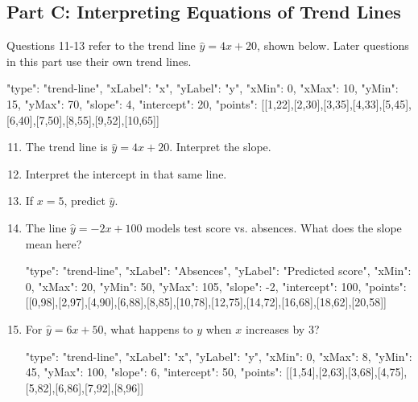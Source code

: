 \documentclass[14pt]{extarticle}
\begin{document}
\subsection*{Part C: Interpreting Equations of Trend Lines}
Questions 11-13 refer to the trend line \(\hat{y} = 4x + 20\), shown below. Later questions in this part use their own trend lines.

\begin{diagramdata}
{
  "type": "trend-line",
  "xLabel": "x",
  "yLabel": "y",
  "xMin": 0,
  "xMax": 10,
  "yMin": 15,
  "yMax": 70,
  "slope": 4,
  "intercept": 20,
  "points": [[1,22],[2,30],[3,35],[4,33],[5,45],[6,40],[7,50],[8,55],[9,52],[10,65]]
}
\end{diagramdata}

\begin{enumerate}
  \setcounter{enumi}{10}
  \item The trend line is \(\hat{y} = 4x + 20\). Interpret the slope.
  \item Interpret the intercept in that same line.
  \item If \(x = 5\), predict \(\hat{y}\).
  \item The line \(\hat{y} = -2x + 100\) models test score vs. absences. What does the slope mean here?
  \begin{diagramdata}
  {
    "type": "trend-line",
    "xLabel": "Absences",
    "yLabel": "Predicted score",
    "xMin": 0,
    "xMax": 20,
    "yMin": 50,
    "yMax": 105,
    "slope": -2,
    "intercept": 100,
    "points": [[0,98],[2,97],[4,90],[6,88],[8,85],[10,78],[12,75],[14,72],[16,68],[18,62],[20,58]]
  }
  \end{diagramdata}
  \item For \(\hat{y} = 6x + 50\), what happens to \(y\) when \(x\) increases by 3?
  \begin{diagramdata}
  {
    "type": "trend-line",
    "xLabel": "x",
    "yLabel": "y",
    "xMin": 0,
    "xMax": 8,
    "yMin": 45,
    "yMax": 100,
    "slope": 6,
    "intercept": 50,
    "points": [[1,54],[2,63],[3,68],[4,75],[5,82],[6,86],[7,92],[8,96]]
  }
  \end{diagramdata}
\end{enumerate}
\end{document}
